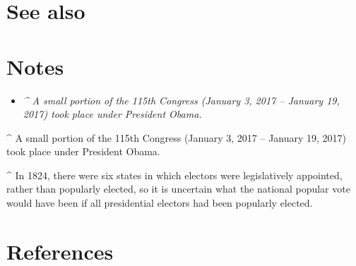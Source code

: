 \section{See also}\label{see-also}

\section{Notes}\label{notes}

\begin{itemize}
\item
  \emph{\^{} A small portion of the 115th Congress (January 3, 2017 --
  January 19, 2017) took place under President Obama.}
\end{itemize}

\^{} A small portion of the 115th Congress (January 3, 2017 -- January
19, 2017) took place under President Obama.

\^{} In 1824, there were six states in which electors were legislatively
appointed, rather than popularly elected, so it is uncertain what the
national popular vote would have been if all presidential electors had
been popularly elected.

\section{References}\label{references}
